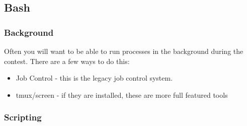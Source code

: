 \subsection{Bash}

\subsubsection{Background}
Often you will want to be able to run processes in the background during the contest.
There are a few ways to do this:

\begin{itemize}
	\item Job Control - this is the legacy job control system.
	\item tmux/screen - if they are installed, these are more full featured tools
\end{itemize}


\subsubsection{Scripting}

